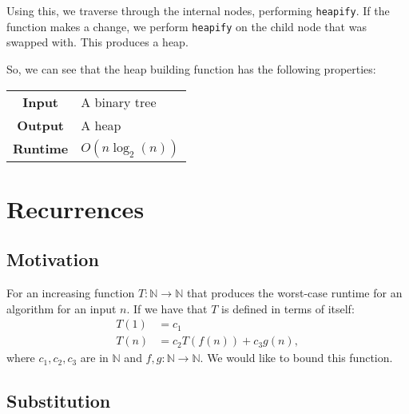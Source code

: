 \documentclass[a4paper, 12pt, twoside]{article}
\begin{document}
Using this, we traverse through the internal nodes, performing
\texttt{heapify}. If the function makes a change, we perform
\texttt{heapify} on the child node that was swapped with.
This produces a heap.

\vspace{\baselineskip}

So, we can see that the heap building function has the following
properties:

\begin{center}
      \begin{tabular}{ || c | p{8.5cm} || }
            \hline
                  \textbf{Input} & A binary tree \\
                  \textbf{Output} & A heap \\
            \hline\hline
                  \textbf{Runtime} & $O(n\log_2(n))$ \\
            \hline
      \end{tabular}
\end{center}

\section{Recurrences}

\subsection{Motivation}

For an increasing function $T: \mathbb{N} \to \mathbb{N}$ that
produces the worst-case runtime for an algorithm for an input
$n$. If we have that $T$ is defined in terms of itself:
\begin{align*}
      T(1) &= c_1 \\
      T(n) &= c_2T(f(n)) + c_3g(n),
\end{align*}
where $c_1, c_2, c_3$ are in $\mathbb{N}$ and 
$f, g: \mathbb{N} \to \mathbb{N}$. We would like to bound
this function.

\subsection{Substitution}
\end{document}
